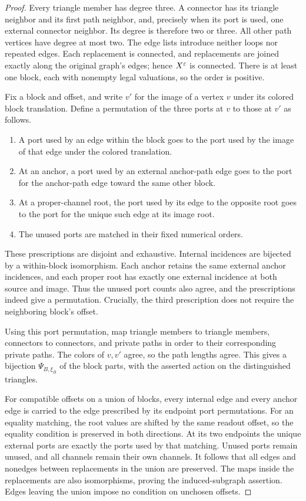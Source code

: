 \begin{proof}
Every triangle member has degree three.
A connector has its triangle neighbor and its first path neighbor,
and, precisely when its port is used, one external connector neighbor.
Its degree is therefore two or three.
All other path vertices have degree at most two.
The edge lists introduce neither loops nor repeated edges.
Each replacement is connected, and replacements are joined exactly
along the original graph's edges; hence \(X^\varepsilon\) is connected.
There is at least one block, each with nonempty legal valuations,
so the order is positive.

Fix a block and offset, and write \(v'\) for the image of a vertex
\(v\) under its colored block translation.
Define a permutation of the three ports at \(v\) to those at \(v'\)
as follows.
\begin{enumerate}
\item
A port used by an edge within the block goes to the port used by the
image of that edge under the colored translation.
\item
At an anchor, a port used by an external anchor-path edge goes to the
port for the anchor-path edge toward the same other block.
\item
At a proper-channel root, the port used by its edge to the opposite
root goes to the port for the unique such edge at its image root.
\item
The unused ports are matched in their fixed numerical orders.
\end{enumerate}
These prescriptions are disjoint and exhaustive.
Internal incidences are bijected by a within-block isomorphism.
Each anchor retains the same external anchor incidences, and each
proper root has exactly one external incidence at both source and
image.  Thus the unused port counts also agree, and the prescriptions
indeed give a permutation.
Crucially, the third prescription does not require the neighboring
block's offset.

Using this port permutation, map triangle members to triangle members,
connectors to connectors, and private paths in order to their
corresponding private paths.  The colors of \(v,v'\) agree, so the
path lengths agree.  This gives a bijection
\(\Psi_{B,\xi_B}\) of the block parts, with the asserted action on the
distinguished triangles.

For compatible offsets on a union of blocks, every internal edge and
every anchor edge is carried to the edge prescribed by its endpoint
port permutations.
For an equality matching, the root values are shifted by the same
readout offset, so the equality condition is preserved in both
directions.  At its two endpoints the unique external ports are
exactly the ports used by that matching.
Unused ports remain unused, and all channels remain their own channels.
It follows that all edges and nonedges between replacements in the
union are preserved.  The maps inside the replacements are also
isomorphisms, proving the induced-subgraph assertion.
Edges leaving the union impose no condition on unchosen offsets.


\end{proof}

